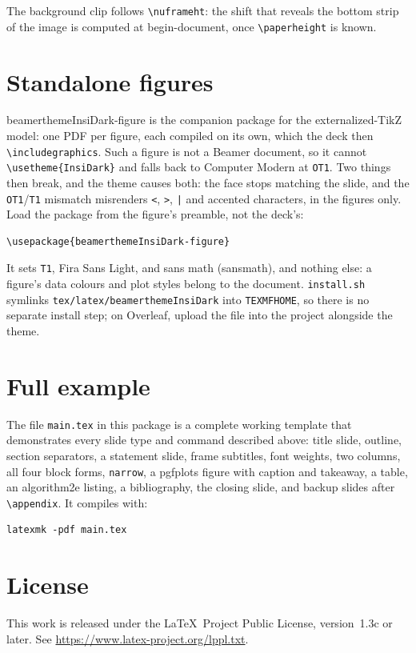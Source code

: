 \documentclass[a4paper,11pt]{article}
\begin{document}
The background clip follows \verb|\nuframeht|: the shift that reveals the
bottom strip of the image is computed at begin-document, once
\verb|\paperheight| is known.

\section{Standalone figures}
\label{sec:figure}

\textsf{beamerthemeInsiDark-figure} is the companion package for the
externalized-TikZ model: one PDF per figure, each compiled on its own, which
the deck then \verb|\includegraphics|.  Such a figure is not a Beamer document,
so it cannot \verb|\usetheme{InsiDark}| and falls back to Computer Modern at
\texttt{OT1}.  Two things then break, and the theme causes both: the face stops
matching the slide, and the \texttt{OT1}/\texttt{T1} mismatch misrenders
\texttt{<}, \texttt{>}, \texttt{|} and accented characters, in the figures
only.  Load the package from the figure's preamble, not the deck's:

\begin{lstlisting}
\usepackage{beamerthemeInsiDark-figure}
\end{lstlisting}

It sets \texttt{T1}, Fira Sans Light, and sans math (\textsf{sansmath}), and
nothing else: a figure's data colours and plot styles belong to the document.
\texttt{install.sh} symlinks \texttt{tex/latex/beamerthemeInsiDark} into \texttt{TEXMFHOME}, so
there is no separate install step; on Overleaf, upload the file into the
project alongside the theme.

\section{Full example}

The file \texttt{main.tex} in this package is a complete working template that
demonstrates every slide type and command described above: title slide,
outline, section separators, a statement slide, frame subtitles, font weights,
two columns, all four block forms, \texttt{narrow}, a \textsf{pgfplots} figure
with caption and takeaway, a table, an \textsf{algorithm2e} listing, a
bibliography, the closing slide, and backup slides after \verb|\appendix|.  It
compiles with:

\begin{lstlisting}
latexmk -pdf main.tex
\end{lstlisting}

\section{License}

This work is released under the \LaTeX\ Project Public License,
version~1.3c or later.
See \url{https://www.latex-project.org/lppl.txt}.
\end{document}

